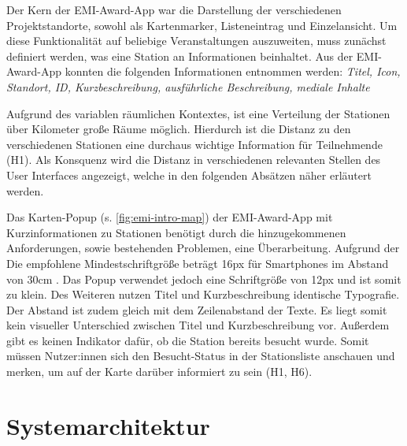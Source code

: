 
Der Kern der EMI-Award-App war die Darstellung der verschiedenen
Projektstandorte, sowohl als Kartenmarker, Listeneintrag und Einzelansicht. Um
diese Funktionalität auf beliebige Veranstaltungen auszuweiten, muss zunächst
definiert werden, was eine Station an Informationen beinhaltet. Aus der
EMI-Award-App konnten die folgenden Informationen entnommen werden:
\textit{Titel, Icon, Standort, ID, Kurzbeschreibung, ausführliche Beschreibung,
mediale Inhalte}

Aufgrund des variablen räumlichen Kontextes, ist eine Verteilung der Stationen
über Kilometer große Räume möglich. Hierdurch ist die Distanz zu den
verschiedenen Stationen eine durchaus wichtige Information für Teilnehmende
(H1). Als Konsquenz wird die Distanz in verschiedenen relevanten Stellen des
User Interfaces angezeigt, welche in den folgenden Absätzen näher erläutert
werden.

Das Karten-Popup (s. \autoref{fig:emi-intro-map}) der EMI-Award-App mit
Kurzinformationen zu Stationen benötigt durch die hinzugekommenen Anforderungen,
sowie bestehenden Problemen, eine Überarbeitung. Aufgrund der Die empfohlene
Mindestschriftgröße beträgt 16px für Smartphones im Abstand von 30cm
\cite{DBSV2022}. Das Popup verwendet jedoch eine Schriftgröße von 12px und ist
somit zu klein. Des Weiteren nutzen Titel und Kurzbeschreibung identische
Typografie. Der Abstand ist zudem gleich mit dem Zeilenabstand der Texte. Es
liegt somit kein visueller Unterschied zwischen Titel und Kurzbeschreibung vor.
Außerdem gibt es keinen Indikator dafür, ob die Station bereits besucht wurde.
Somit müssen Nutzer:innen sich den Besucht-Status in der Stationsliste anschauen
und merken, um auf der Karte darüber informiert zu sein (H1, H6).

\section{Systemarchitektur}


